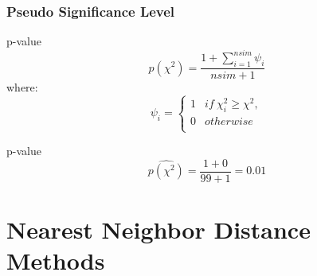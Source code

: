 \documentclass[nototal,handout]{beamer}
\begin{document}
\begin{frame}[<+->]
    \frametitle{Pseudo Significance Level}
    \begin{block}{p-value}
      \begin{equation}
	p(\chi^2) = \frac{1+ \sum_{i=1}^{nsim} \psi_i}{nsim+1}
      \end{equation}
      where:
      \begin{equation}
	\psi_{i} = \left\{ \begin{array}{ll}
	  1& if \ \chi_i^2 \ge \chi^2, \\
	  0&otherwise\\
	\end{array} \right.
      \end{equation}
     \end{block}
\begin{block}{p-value}
      \begin{equation}
	\hat{p(\chi^2)} = \frac{1+ 0}{99+1} = 0.01
      \end{equation}
     \end{block}
  \end{frame}


\section{Nearest Neighbor Distance Methods}
\end{document}
